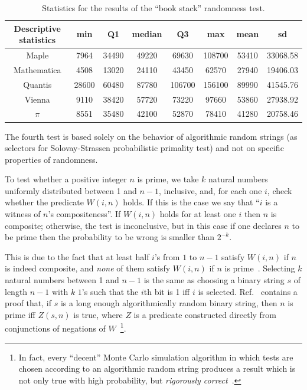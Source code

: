 \documentclass[%
 preprint,
 showpacs,
 showkeys,
 preprintnumbers,
 amsmath,amssymb,
 aps,
 prl,
  longbibliography,
 ]{revtex4-1}
\begin{document}
\begin{table}
\caption{Statistics for the results of  the ``book stack'' randomness
test.}\label{tab:3}
\begin{center}
\begin{tabular}
[c]{ c c c c c c c c }%
\hline\hline
Descriptive statistics & min & Q1 & median & Q3 & max & mean & sd\\\hline
Maple & 7964 & 34490 & 49220 & 69630 & 108700 & 53410 & 33068.58\\
Mathematica & 4508 & 13020 & 24110 & 43450 & 62570 & 27940 & 19406.03\\
Quantis & 28600 & 60480 & 87780 & 106700 & 156100 & 89990 & 41545.76\\
Vienna & 9110 & 38420 & 57720 & 73220 & 97660 & 53860 & 27938.92\\
$\pi$ & 8551 & 35480 & 42100 & 52870 & 78410 & 41280 & 20758.46\\\hline\hline
\end{tabular}
\end{center}
\end{table}


The fourth test is   based solely on the behavior of algorithmic random strings (as
selectors for Solovay-Strassen probabilistic primality test) and not on specific properties of randomness.

To test whether  a positive integer
$n$ is prime, we take $k$ natural numbers uniformly distributed between 1
and $n - 1$, inclusive, and, for each one $i$, check whether the predicate
$W (i, n)$ holds.  If this is the case we say that
``$i$ is a witness of $n$'s compositeness''.
If $W (i, n)$ holds for at least one $i$ then $n$ is
composite; otherwise, the test is inconclusive, but in this case if one declares $n$ to be  prime then the
 probability to be wrong is smaller than $ 2^{-k}$.

 This is due to the fact that
 at least half  $i$'s from $1$ to $ n - 1$ satisfy $W (i, n)$  if $n$ is indeed composite,
 and {\it none} of them satisfy $W (i, n)$ if $n$ is prime~\cite{solovay:84}.
Selecting $k$ natural numbers  between 1
and $n - 1$ is the same as choosing a binary string $s$ of length $n-1$ with $k$ $1$'s
such that the $i$th bit is 1 iff $i$ is selected.
Ref.~\cite{ch-schw-78} contains a  proof that, if $s$ is a long enough   algorithmically random binary string,
then $n$ is prime iff $Z(s,n)$ is true,
where $Z$ is a predicate constructed directly from conjunctions of negations of  $W$~\footnote{
In fact, every  ``decent'' Monte Carlo simulation algorithm in  which  tests are chosen according to an
algorithmic random string produces a result
which is not only true with high probability, but {\it rigorously correct}~\cite{MR757602}.}.
\end{document}
